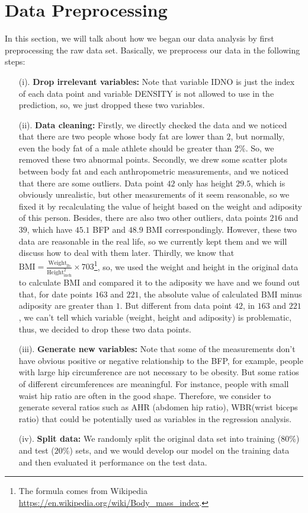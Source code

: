 \documentclass[letterpaper,10pt]{article}
\begin{document}
\section{Data Preprocessing}
In this section, we will talk about how we began our data analysis by first preprocessing the raw data set. Basically, we preprocess our data in the following steps:
\begin{itemize}
\item[(i).] \textbf{Drop irrelevant variables:} Note that variable IDNO is just the index of each data point and variable DENSITY is not allowed to use in the prediction, so, we just dropped these two variables. 
\item[(ii).] \textbf{Data cleaning:} Firstly, we directly checked the data and we noticed that there are two people whose body fat are lower than $2$, but normally, even the body fat of a male athlete should be greater than $2\%$. So, we removed these two abnormal points. Secondly, we drew some scatter plots between body fat and each anthropometric measurements, and we noticed that there are some outliers. Data point $42$ only has height $29.5$, which is obviously unrealistic, but other measurements of it seem reasonable, so we fixed it by recalculating the value of height based on the weight and adiposity of this person. Besides, there are also two other outliers, data points $216$ and $39$, which have $45.1$ BFP and $48.9$ BMI correspondingly. However, these two data are reasonable in the real life, so we currently kept them and we will discuss how to deal with them later. Thirdly, we know that $\text{BMI} = \frac{\text{Weight}_{\text{lb}}}{\text{Height}_{\text{inch}}^2} \times 703$\footnote{The formula comes from Wikipedia \url{https://en.wikipedia.org/wiki/Body_mass_index}.}, so, we used the weight and height in the original data to calculate BMI and compared it to the adiposity we have and we found out that, for date points $163$ and $221$, the absolute value of calculated BMI minus adiposity are greater than $1$. But different from data point $42$, in $163$ and $221$, we can't tell which variable (weight, height and adiposity) is problematic, thus, we decided to drop these two data points.
\item[(iii).] \textbf{Generate new variables:} Note that some of the measurements don't have obvious positive or negative relationship to the BFP, for example, people with large hip circumference are not necessary to be obesity. But some ratios of different circumferences are meaningful. For instance, people with small waist hip ratio are often in the good shape. Therefore, we consider to generate several ratios such as AHR (abdomen hip ratio), WBR(wrist biceps ratio) that could be potentially used as variables in the regression analysis.
\item[(iv).] \textbf{Split data:} We randomly split the original data set into training ($80\%$) and test ($20\%$) sets, and we would develop our model on the training data and then evaluated it performance on the test data.
\end{itemize}
 
\end{document}

